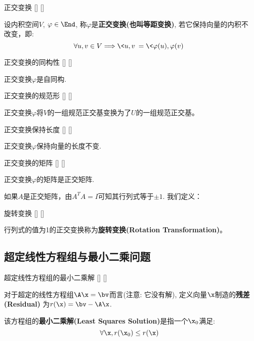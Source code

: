 \documentclass[UTF8]{ctexart}
\begin{document}
		\begin{dfn}
			[]
			{正交变换}
			[]
			[]

			设内积空间$V$, $\varphi\in\End$, 称$\varphi$是\textbf{正交变换(也叫等距变换)}, 若它保持向量的内积不改变，即: 
			\[\forall u,v\in V\Longrightarrow\<u,v\>=\<\varphi(u),\varphi(v)\>\]
		\end{dfn}
		
		\begin{ppt}
			[]
			{正交变换的同构性}
			[]
			[]

			正交变换$\varphi$是自同构. 
		\end{ppt}
		
		\begin{ppt}
			[]
			{正交变换的规范形}
			[]
			[]

			正交变换$\varphi$将$V$的一组规范正交基变换为了$U$的一组规范正交基。
		\end{ppt}

		\begin{ppt}
			[]
			{正交变换保持长度}
			[]
			[]

			正交变换$\varphi$保持向量的长度不变. 
		\end{ppt}

		\begin{ppt}
			[]
			{正交变换的矩阵}
			[]
			[]

			正交变换$\varphi$的矩阵是正交矩阵.
		\end{ppt}

		如果$A$是正交矩阵，由\(A^TA=I\)可知其行列式等于$\pm 1$. 我们定义：

		\begin{dfn}
			[]
			{旋转变换}
			[]
			[]

			行列式的值为1的正交变换称为\textbf{旋转变换(Rotation Transformation)}。
		\end{dfn}

	
	\subsection{超定线性方程组与最小二乘问题}
	
		\begin{dfn}
			[]
			{超定线性方程组的最小二乘解}
			[]
			[]

			对于超定的线性方程组$\A\x=\bv$而言(注意: 它没有解), 定义向量$\x$制造的\textbf{残差(Residual)} 为$r(\x)=\bv-\A\x$. 
			
			该方程组的\textbf{最小二乘解(Least Squares Solution)}是指一个$\x_0$满足: 
			\[\forall \x, r(\x_0)\leq r(\x)\]
		\end{dfn}
	
\end{document}
